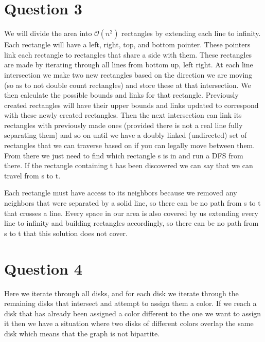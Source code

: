 \documentclass[12pt]{article}
\begin{document}
\section*{Question 3}
We will divide the area into  $\mathcal{O}(n^2)$ rectangles by extending each line to infinity. Each rectangle will have a left, right, top, and bottom pointer. These pointers link each rectangle to rectangles that share a side with them. These rectangles are made by iterating through all lines from bottom up, left right. At each line intersection we make two new rectangles based on the direction we are moving (so as to not double count rectangles) and store these at that intersection. We then calculate the possible bounds and links for that rectangle. Previously created rectangles will have their upper bounds and links updated to correspond with these newly created rectangles. Then the next intersection can link its rectangles with previously made ones (provided there is not a real line fully separating them) and so on until we have a doubly linked (undirected) set of rectangles that we can traverse based on if you can legally move between them. From there we just need to find which rectangle s is in and run a DFS from there. If the rectangle containing t has been discovered we can say that we can travel from s to t.

Each rectangle must have access to its neighbors because we removed any neighbors that were separated by a solid line, so there can be no path from s to t that crosses a line. Every space in our area is also covered by us extending every line to infinity and building rectangles accordingly, so there can be no path from s to t that this solution does not cover.


\section*{Question 4}
Here we iterate through all disks, and for each disk we iterate through the remaining disks that intersect and attempt to assign them a color. If we reach a disk that has already been assigned a color different to the one we want to assign it then we have a situation where two disks of different colors overlap the same disk which means that the graph is not bipartite.
\end{document}

